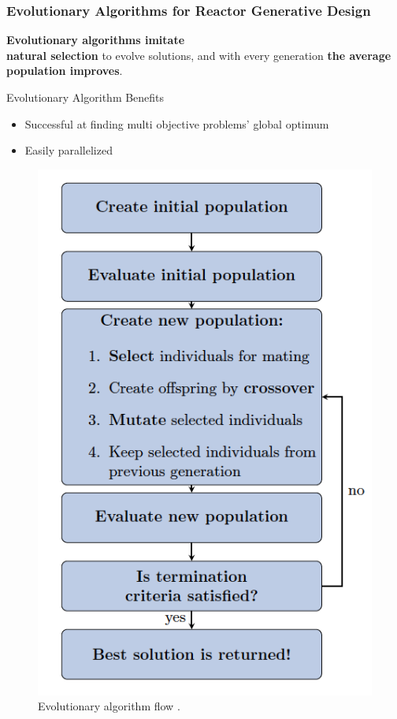     \begin{frame}
    \frametitle{Evolutionary Algorithms for Reactor Generative Design}
    \begin{minipage}{0.49\textwidth}
        \textbf{Evolutionary algorithms imitate \\ natural selection} to evolve solutions,  
        and with every generation \textbf{the average population improves}. 

        \vspace{0.3cm}
        Evolutionary Algorithm Benefits 
        \begin{itemize}
            \item Successful at finding multi objective problems' global optimum 
            \item Easily parallelized 
        \end{itemize}
        \end{minipage}
    \begin{minipage}[c]{0.49\textwidth}
        \begin{figure}
            \includegraphics[width=0.7\linewidth]{figures/ea-flow.png} 
            \caption{Evolutionary algorithm flow \cite{renner_genetic_2003}. }
          \end{figure}
    \end{minipage}
    \end{frame}

